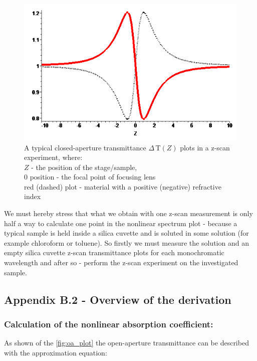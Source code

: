 \documentclass[12pt,twoside,a4paper]{article}
\numberwithin{equation}{subsection}
\numberwithin{figure}{subsection}
\begin{document}
\begin{figure}
  \includegraphics{img/ca_plot.png}
  \caption{A typical closed-aperture transmittance $\Delta \,\mathrm{T}(Z)$ plots in a z-scan experiment, where: \\  
    $Z$ - the position of the stage/sample, \\
    $0$ position - the focal point of focusing lens \\
    red (dashed) plot - material with a positive (negative) refractive index
    \label{fig:ca_plot}}
\end{figure}

We must hereby stress that what we obtain with one z-scan measurement is only half a way to calculate one point in the nonlinear
spectrum plot - because a typical sample is held inside a silica cuvette and is soluted in some solution (for example chloroform or
toluene). So firstly we must measure the solution and an empty silica cuvette z-scan transmittance plots for each monochromatic
wavelength and after so - perform the z-scan experiment on the investigated sample. 

\subsection*{Appendix B.2 - Overview of the derivation} \label{chap:zscan_derivation}

\subsubsection*{Calculation of the nonlinear absorption coefficient:}

As shown of the \ref{fig:oa_plot} the open-aperture transmittance can be described with the approximation equation:
\end{document}
